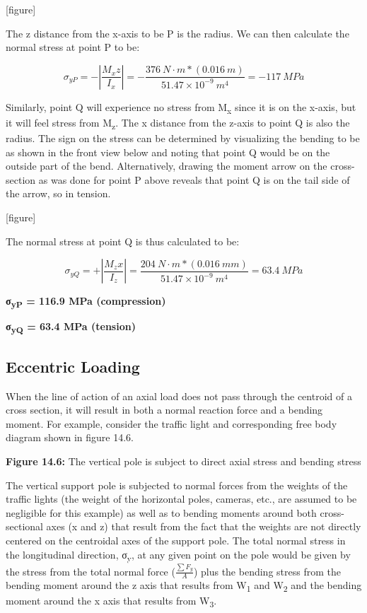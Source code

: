 \documentclass[
  letterpaper,
  DIV=11,
  numbers=noendperiod]{scrreprt}
\theoremstyle{definition}
\theoremstyle{remark}
\begin{document}
\begin{tcolorbox}
\begin{tcolorbox}
{[}figure{]}

The z distance from the x-axis to be P is the radius. We can then
calculate the normal stress at point P to be:

\[
\sigma_{yP}=-\left|\frac{M_x z}{I_x}\right|=-\frac{376{~N}\cdot{m}*(0.016{~m})}{51.47 \times 10^{-9}{~m}^4}=-117{~MPa}
\]

Similarly, point Q will experience no stress from M\textsubscript{x}
since it is on the x-axis, but it will feel stress from
M\textsubscript{z}. The x distance from the z-axis to point Q is also
the radius. The sign on the stress can be determined by visualizing the
bending to be as shown in the front view below and noting that point Q
would be on the outside part of the bend. Alternatively, drawing the
moment arrow on the cross-section as was done for point P above reveals
that point Q is on the tail side of the arrow, so in tension.

{[}figure{]}

The normal stress at point Q is thus calculated to be:

\[
\sigma_{y Q}=+\left|\frac{M_z x}{I_z}\right|=\frac{204{~N}\cdot{m}*(0.016{~mm})}{51.47 \times 10^{-9}{~m}^4}=63.4{~MPa}
\]

\textbf{σ\textsubscript{yP} = 116.9 MPa (compression)}

\textbf{σ\textsubscript{yQ} = 63.4 MPa (tension)}

\end{tcolorbox}

\end{tcolorbox}

\subsection{Eccentric Loading}\label{eccentric-loading}

When the line of action of an axial load does not pass through the
centroid of a cross section, it will result in both a normal reaction
force and a bending moment. For example, consider the traffic light and
corresponding free body diagram shown in figure 14.6.

\textbf{Figure 14.6:} The vertical pole is subject to direct axial
stress and bending stress

The vertical support pole is subjected to normal forces from the weights
of the traffic lights (the weight of the horizontal poles, cameras,
etc., are assumed to be negligible for this example) as well as to
bending moments around both cross-sectional axes (x and z) that result
from the fact that the weights are not directly centered on the
centroidal axes of the support pole. The total normal stress in the
longitudinal direction, σ\textsubscript{y}, at any given point on the
pole would be given by the stress from the total normal force
(\(\frac{\sum F_y}{A}\)) plus the bending stress from the bending moment
around the z axis that results from W\textsubscript{1} and
W\textsubscript{2} and the bending moment around the x axis that results
from W\textsubscript{3}.
\end{document}
